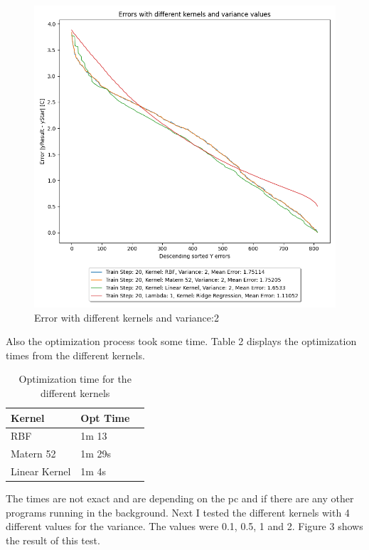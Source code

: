 \documentclass[10pt, a4paper, twocolumn]{article} %
\begin{document}
\begin{figure}[htbp] %
  \centering
  \includegraphics[width=\columnwidth]{pics/TrainStep20_kernel_test_v2.png}
  \caption{Error with different kernels and variance:2}
  \label{fig:fibonacciPlot}
\end{figure}
Also the optimization process took some time. Table 2 displays the optimization times from the different kernels. 
\begin{table}[htbp]
    \label{tab:kernelSettings}
	\caption{Optimization time for the different kernels}
	\centering
	\begin{tabular}{llr}
		\cmidrule(r){1-2}
		Kernel & Opt Time \\
		\midrule
		RBF & 1m 13\\	
		Matern 52 & 1m 29s\\				
		Linear Kernel & 1m 4s\\
		\bottomrule
	\end{tabular}
\end{table}
The times are not exact and are depending on the pc and if there are any other programs running in the background.
Next I tested the different kernels with 4 different values for the variance. The values were 0.1, 0.5, 1 and 2. Figure 3 shows the result of this test. 
\end{document}
